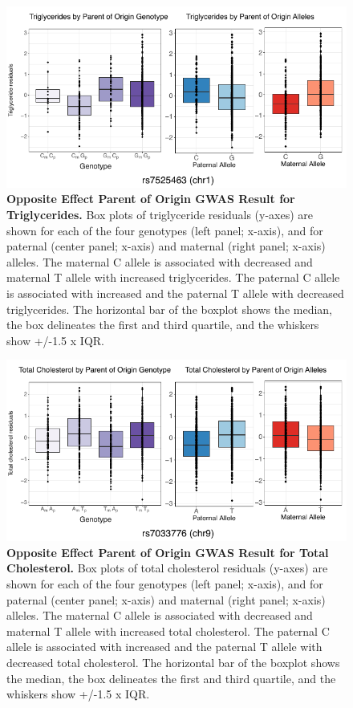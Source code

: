 \begin{figure}[!htb]
\centering
\includegraphics[width=5in]{img/ch02/fig-s10.pdf}
\caption[Opposite Effect Parent of Origin GWAS Result for Triglycerides.]{\textbf{Opposite Effect Parent of Origin GWAS Result for Triglycerides.}  Box plots of triglyceride residuals (y-axes) are shown for each of the four genotypes (left panel; x-axis), and for paternal (center panel; x-axis) and maternal (right panel; x-axis) alleles. The maternal C allele is associated with decreased and maternal T allele with increased triglycerides. The paternal C allele is associated with increased and the paternal T allele with decreased triglycerides. The horizontal bar of the boxplot shows the median, the box delineates the first and third quartile, and the whiskers show +/-1.5 x IQR.}
\label{fig:fig-s10}
\end{figure}

\begin{figure}[!htb]
\centering
\includegraphics[width=5in]{img/ch02/fig-s11.pdf}
\caption[Opposite Effect Parent of Origin GWAS Result for Total Cholesterol.]{\textbf{Opposite Effect Parent of Origin GWAS Result for Total Cholesterol.}  Box plots of total cholesterol residuals (y-axes) are shown for each of the four genotypes (left panel; x-axis), and for paternal (center panel; x-axis) and maternal (right panel; x-axis) alleles. The maternal C allele is associated with decreased and maternal T allele with increased total cholesterol. The paternal C allele is associated with increased and the paternal T allele with decreased total cholesterol. The horizontal bar of the boxplot shows the median, the box delineates the first and third quartile, and the whiskers show +/-1.5 x IQR.}
\label{fig:fig-s11}
\end{figure}

